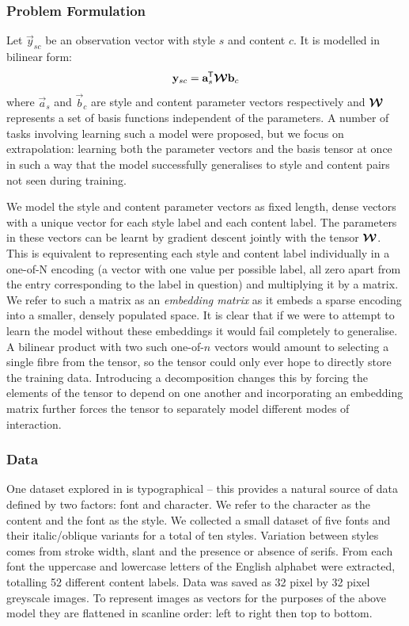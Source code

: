 \subsubsection{Problem Formulation}
Let \(\vec{y}_{sc}\) be an observation vector with style \(s\) and content \(c\). It is modelled
in bilinear form:
\begin{equation}
	\mathbf{y}_{sc} = \mathbf{a}_s^{\mkern-1.5mu\mathsf{T}}\bm{\mathcal{W}}\mathbf{b}_c
\end{equation} where \(\vec{a}_s\) and \(\vec{b}_c\) are style and content parameter vectors
respectively and \(\bm{\mathcal{W}}\) represents a set of basis functions independent of the parameters.
A number of tasks involving learning such a model were proposed, but we focus on extrapolation:
 learning both the parameter vectors and the basis tensor at once in such a way that
the model successfully generalises to style and content pairs not seen during training.

We model the style and content parameter vectors as fixed length, dense vectors with a unique
vector for each style label and each content label. The parameters in these vectors can be
learnt by gradient descent jointly with the tensor \(\bm{\mathcal{W}}\). This is equivalent
to representing each style and content label individually
in a one-of-N encoding (a vector with one value per possible label, all
zero apart from the entry corresponding to the label in question) and multiplying it by
a matrix. We refer to such a matrix as an \emph{embedding matrix} as it embeds a sparse encoding
into a smaller, densely populated space. It is clear that if we
were to attempt to learn the model without these embeddings it would fail completely to
generalise. A bilinear product with two such one-of-\(n\) 
vectors would amount to selecting a single fibre
from the tensor, so the tensor could only ever hope to directly store the training data.
Introducing a decomposition changes this by forcing the elements of the tensor to depend on
one another and incorporating an embedding matrix further forces the tensor to separately model
different modes of interaction.

\subsubsection{Data}
One dataset explored in \autocite{Tenenbaum2000} is typographical -- this provides a natural
source of data defined by two factors: font and character. We refer to the character as the
content and the font as the style. We collected a small dataset of five fonts and their
italic/oblique variants for a total of ten styles. Variation between styles comes from stroke
width, slant and the presence or absence of serifs. From each font the uppercase and lowercase
letters of the English alphabet were extracted, totalling 52 different content labels. Data was
saved as 32 pixel by 32 pixel greyscale images. To represent images as vectors for the purposes
of the above model they are flattened in scanline order: left to right then top to bottom.

